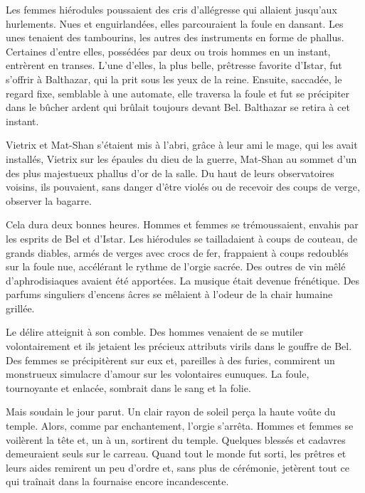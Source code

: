 \documentclass[a4paper, 11pt, oneside, polutonikogreek, french]{article}
\begin{document}
Les femmes hiérodules poussaient des cris d'allégresse qui allaient jusqu'aux hurlements. Nues et enguirlandées, elles parcouraient la foule en dansant. Les unes tenaient des tambourins, les autres des instruments en forme de phallus. Certaines d'entre elles, possédées par deux ou trois hommes en un instant, entrèrent en transes. L'une d'elles, la plus belle, prêtresse favorite d'Istar, fut s'offrir à Balthazar, qui la prit sous les yeux de la reine. Ensuite, saccadée, le regard fixe, semblable à une automate, elle traversa la foule et fut se précipiter dans le bûcher ardent qui brûlait toujours devant Bel. Balthazar se retira à cet instant.

Vietrix et Mat-Shan s'étaient mis à l'abri, grâce à leur ami le mage, qui les avait installés, Vietrix sur les épaules du dieu de la guerre, Mat-Shan au sommet d'un des plus majestueux phallus d'or de la salle. Du haut de leurs observatoires voisins, ils pouvaient, sans danger d'être violés ou de recevoir des coups de verge, observer la bagarre.

Cela dura deux bonnes heures. Hommes et femmes se trémoussaient, envahis par les esprits de Bel et d'Istar. Les hiérodules se tailladaient à coups de couteau, de grands diables, armés de verges avec crocs de fer, frappaient à coups redoublés sur la foule nue, accélérant le rythme de l'orgie sacrée. Des outres de vin mêlé d'aphrodisiaques avaient été apportées. La musique était devenue frénétique. Des parfums singuliers d'encens âcres se mêlaient à l'odeur de la chair humaine grillée.

Le délire atteignit à son comble. Des hommes venaient de se mutiler volontairement et ils jetaient les précieux attributs virils dans le gouffre de Bel. Des femmes se précipitèrent sur eux et, pareilles à des furies, commirent un monstrueux simulacre d'amour sur les volontaires eunuques. La foule, tournoyante et enlacée, sombrait dans le sang et la folie.

\bigskip
\centerline{\EightStarTaper}
\centerline{\EightStarTaper\EightStarTaper}
\bigskip

Mais soudain le jour parut. Un clair rayon de soleil perça la haute voûte du temple. Alors, comme par enchantement, l'orgie s'arrêta. Hommes et femmes se voilèrent la tête et, un à un, sortirent du temple. Quelques blessés et cadavres demeuraient seuls sur le carreau. Quand tout le monde fut sorti, les prêtres et leurs aides remirent un peu d'ordre et, sans plus de cérémonie, jetèrent tout ce qui traînait dans la fournaise encore incandescente.
\end{document}
